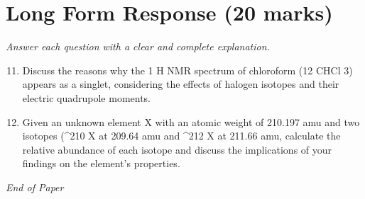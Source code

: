 \documentclass[12pt]{article}
\begin{document}
\section*{Long Form Response (20 marks)}
\textit{Answer each question with a clear and complete explanation.}
\begin{enumerate}[label=\arabic*.]
\setcounter{enumi}{10}
\item Discuss the reasons why the 1 H NMR spectrum of chloroform (12 CHCl 3) appears as a singlet, considering the effects of halogen isotopes and their electric quadrupole moments.
\item Given an unknown element X with an atomic weight of 210.197 amu and two isotopes (^210 X at 209.64 amu and ^212 X at 211.66 amu, calculate the relative abundance of each isotope and discuss the implications of your findings on the element's properties.
\end{enumerate}

\vfill
\noindent\textit{End of Paper}
\end{document}
